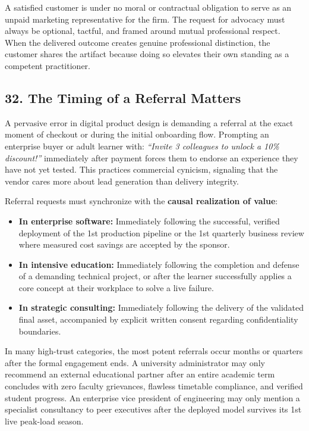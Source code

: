A satisfied customer is under no moral or contractual obligation to serve as an unpaid marketing representative for the firm. The request for advocacy must always be optional, tactful, and framed around mutual professional respect. When the delivered outcome creates genuine professional distinction, the customer shares the artifact because doing so elevates their own standing as a competent practitioner.

\subsection*{32. The Timing of a Referral Matters}

A pervasive error in digital product design is demanding a referral at the exact moment of checkout or during the initial onboarding flow. Prompting an enterprise buyer or adult learner with: \textit{``Invite 3 colleagues to unlock a 10\% discount!''} immediately after payment forces them to endorse an experience they have not yet tested. This practices commercial cynicism, signaling that the vendor cares more about lead generation than delivery integrity.

Referral requests must synchronize with the \textbf{causal realization of value}:
\begin{itemize}[leftmargin=*]
\item \textbf{In enterprise software:} Immediately following the successful, verified deployment of the 1st production pipeline or the 1st quarterly business review where measured cost savings are accepted by the sponsor.
\item \textbf{In intensive education:} Immediately following the completion and defense of a demanding technical project, or after the learner successfully applies a core concept at their workplace to solve a live failure.
\item \textbf{In strategic consulting:} Immediately following the delivery of the validated final asset, accompanied by explicit written consent regarding confidentiality boundaries.
\end{itemize}

In many high-trust categories, the most potent referrals occur months or quarters after the formal engagement ends. A university administrator may only recommend an external educational partner after an entire academic term concludes with zero faculty grievances, flawless timetable compliance, and verified student progress. An enterprise vice president of engineering may only mention a specialist consultancy to peer executives after the deployed model survives its 1st live peak-load season.

